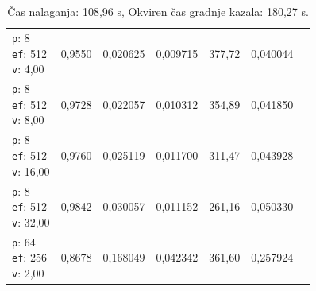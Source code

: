 \begin{table}[htbp]
\begin{tabularx}{\textwidth}{Xrrrrrr}
    \makecell{\texttt{p}: 8\\\texttt{ef}: 512\\\texttt{v}: 4,00} & 0,9550 & 0,020625 & 0,009715 & 377,72 & 0,040044 \\
    \makecell{\texttt{p}: 8\\\texttt{ef}: 512\\\texttt{v}: 8,00} & 0,9728 & 0,022057 & 0,010312 & 354,89 & 0,041850 \\
    \makecell{\texttt{p}: 8\\\texttt{ef}: 512\\\texttt{v}: 16,00} & 0,9760 & 0,025119 & 0,011700 & 311,47 & 0,043928 \\
    \makecell{\texttt{p}: 8\\\texttt{ef}: 512\\\texttt{v}: 32,00} & 0,9842 & 0,030057 & 0,011152 & 261,16 & 0,050330 \\
    \makecell{\texttt{p}: 64\\\texttt{ef}: 256\\\texttt{v}: 2,00} & 0,8678 & 0,168049 & 0,042342 & 361,60 & 0,257924 \\
    \bottomrule
  \end{tabularx}
\caption* {Čas nalaganja: 108,96 s, Okviren čas gradnje kazala: 180,27 s.}\end{table}

